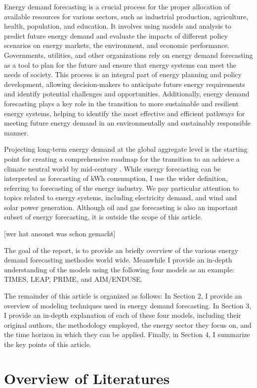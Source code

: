 \documentclass[lettersize,journal]{IEEEtran}
\begin{document}
Energy demand forecasting is a crucial process for the proper allocation of available resources for various sectors, such as industrial production, agriculture, health, population, and education. It involves using models and analysis to predict future energy demand and evaluate the impacts of different policy scenarios on energy markets, the environment, and economic performance. Governments, utilities, and other organizations rely on energy demand forecasting as a tool to plan for the future and ensure that energy systems can meet the needs of society. This process is an integral part of energy planning and policy development, allowing decision-makers to anticipate future energy requirements and identify potential challenges and opportunities. Additionally, energy demand forecasting plays a key role in the transition to more sustainable and resilient energy systems, helping to identify the most effective and efficient pathways for meeting future energy demand in an environmentally and sustainably responsible manner.

Projecting long-term energy demand at the global aggregate level is the starting point for creating a comprehensive roadmap for the transition to an achieve a climate neutral world by mid-century \cite{UNFCCC}. While energy forecasting can be interpreted as forecasting of kWh consumption, I use the wider definition, referring to forecasting of the energy industry. We pay particular attention to topics related to energy systems, including electricity demand, and wind and solar power generation. Although oil and gas forecasting is also an important subset of energy forecasting, it is outside the scope of this article.

[wer hat ansonst was schon gemacht]

The goal of the report, is to provide an briefly overview of the various energy demand forecasting methodes world wide. Meanwhile I provide an in-depth understanding of the models using the following four models as an example: TIMES, LEAP, PRIME, and AIM/ENDUSE.

The remainder of this article is organized as follows: In Section 2, I provide an overview of modeling techniques used in energy demand forecasting. In Section 3, I provide an in-depth explanation of each of these four models, including their original authors, the methodology employed, the energy sector they focus on, and the time horizon in which they can be applied. Finally, in Section 4, I summarize the key points of this article.
\section{Overview of Literatures}
\end{document}
